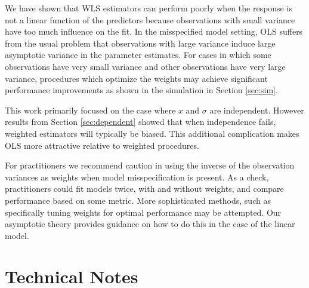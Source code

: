 \documentclass[ejs,ps,preprint]{imsart}
\numberwithin{equation}{section}
\theoremstyle{plain}
\begin{document}
We have shown that WLS estimators can perform poorly when the response is not a linear function of the predictors because observations with small variance have too much influence on the fit. In the misspecified model setting, OLS suffers from the usual problem that observations with large variance induce large asymptotic variance in the parameter estimates. For cases in which some observations have very small variance and other observations have very large variance, procedures which optimize the weights may achieve significant performance improvements as shown in the simulation in Section \ref{sec:sim}.


This work primarily focused on the case where $x$ and $\sigma$ are independent. However results from Section \ref{sec:dependent} showed that when independence fails, weighted estimators will typically be biased. This additional complication makes OLS more attractive relative to weighted procedures.

For practitioners we recommend caution in using the inverse of the observation variances as weights when model misspecification is present. As a check, practitioners could fit models twice, with and without weights, and compare performance based on some metric. More sophisticated methods, such as specifically tuning weights for optimal performance may be attempted. Our asymptotic theory provides guidance on how to do this in the case of the linear model.


\appendix

\section{Technical Notes}
\label{sec:technical_notes}
\end{document}
